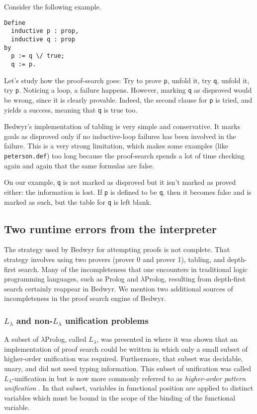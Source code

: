 \documentclass{article}
\providecommand{\texorpdfstring}[2]{#1}
\newcommand{\lp}{$\lambda$Prolog}
\newcommand{\Ll}{$L_\lambda$}
\begin{document}
Consider the following example.
\begin{verbatim}
Define
  inductive p : prop,
  inductive q : prop
by
  p := q \/ true;
  q := p.
\end{verbatim}

Let's study how the proof-search goes:
Try to prove \verb.p., unfold it, try \verb.q., unfold it, try \verb.p..
Noticing a loop, a failure happens.
However, marking \verb.q. as disproved would be wrong,
since it is clearly provable.
Indeed, the second clause for \verb.p. is tried, and yields a
success, meaning that \verb.q. is true too.

Bedwyr's implementation of tabling is very simple and conservative.
It marks goals as
disproved only if no inductive-loop failures has been involved in the failure.
This is a very strong limitation, which makes some examples (like
\verb+peterson.def+) too long because the proof-search spends a lot of time
checking again and again that the same formulas are false.

On our example, \verb.q. is not marked as disproved
but it isn't marked as proved either: the information is lost.
If \verb.p. is defined to be \verb.q.,
then it becomes false and is marked as such,
but the table for \verb.q. is left blank.

\subsection{Two runtime errors from the interpreter}

The strategy used by Bedwyr for attempting proofs is not complete.
That strategy involves using two provers (prover 0 and prover 1),
tabling, and depth-first search.
Many of the incompleteness that one encounters in
traditional logic programming languages, such as Prolog and \lp{},
resulting from depth-first search certainly reappear in Bedwyr.  We
mention two additional sources of incompleteness in the proof search
engine of Bedwyr.

\subsubsection{\texorpdfstring{\Ll{}}{Llambda} and non-\texorpdfstring{\Ll{}}{Llambda} unification problems}
A subset of \lp, called \Ll, was presented in \cite{miller91jlc} where
it was shown that an implementation of proof search could be written
in which only a small subset of higher-order unification was required.
Furthermore, that subset was decidable, unary, and did not need typing
information.  This subset of unification was called \Ll-unification in
\cite{miller91jlc} but is now more commonly referred to as {\em
  higher-order pattern unification}
\cite{nipkow93lics,nadathur05iclp}.  In that subset, variables in
functional position are applied to distinct variables which must be
bound in the scope of the binding of the functional variable.
\end{document}
